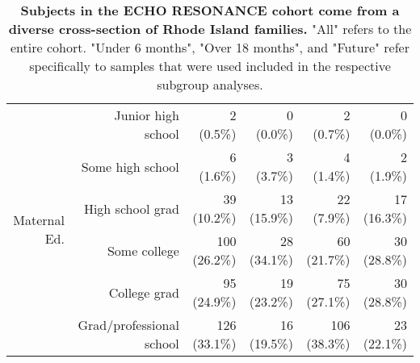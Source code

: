 \documentclass{article}
\begin{document}
\begin{table}[!h]
\begin{tabular}{|r|r|r|r|r|r|}
    \multirow{6}{*}{Maternal Ed.} & Junior high school       & 2 (0.5\%) & 0 (0.0\%) & 2 (0.7\%) & 0 (0.0\%) \\   \cline{2-6}
                                  & Some high school         & 6 (1.6\%) & 3 (3.7\%) & 4 (1.4\%) & 2 (1.9\%) \\ \cline{2-6}
                                  & High school grad         & 39 (10.2\%) & 13 (15.9\%) & 22 (7.9\%) & 17 (16.3\%) \\ \cline{2-6}
                                  & Some college             & 100 (26.2\%) & 28 (34.1\%) & 60 (21.7\%) & 30 (28.8\%) \\ \cline{2-6}
                                  & College grad             & 95 (24.9\%) & 19 (23.2\%) & 75 (27.1\%) & 30 (28.8\%) \\ \cline{2-6}
                                  & Grad/professional school & 126 (33.1\%) & 16 (19.5\%) & 106 (38.3\%) & 23 (22.1\%) \\ \hline\hline
    \end{tabular}
    \caption{\label{tab:demo}\textbf{Subjects in the ECHO RESONANCE cohort come from a diverse cross-section of Rhode Island families.}
            "All" refers to the entire cohort.
            "Under 6 months", "Over 18 months", and "Future" refer specifically
            to samples that were used included in the respective subgroup analyses.
    }
\end{table}
\end{document}

